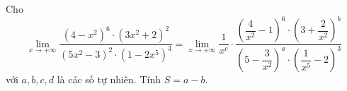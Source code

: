 \begin{ex}
Cho \[\lim\limits_{x\to+\infty}\dfrac{(4-x^2)^6\cdot(3x^2+2)^2}{(5x^2-3)^2\cdot(1-2x^5)^3}=\lim\limits_{x\to+\infty}\dfrac1{x^c}\cdot\dfrac{\left(\dfrac4{x^2}-1\right)^6\cdot\left(3+\dfrac2{x^2}\right)^b}{\left(5-\dfrac3{x^2}\right)^a\cdot\left(\dfrac1{x^5}-2\right)^3}\] với $a,b,c,d$ là các số tự nhiên. Tính $S=a-b$.
\end{ex}

